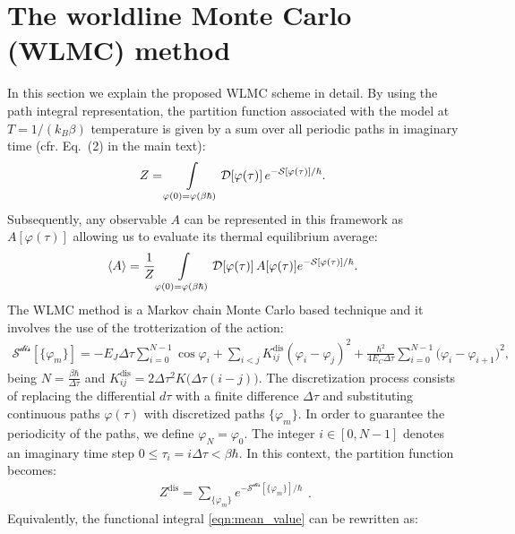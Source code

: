 \documentclass[aps,notitlepage,twocolumn,prl,nolongbibliography,superscriptaddress]{revtex4-2}
\begin{document}
\setcounter{equation}{0}
\renewcommand{\theequation}{S\arabic{equation}}
\setcounter{figure}{0}
\renewcommand{\thefigure}{S\arabic{figure}}
\setcounter{section}{0}
\renewcommand{\thesection}{S\Alph{section}}

\section{The worldline Monte Carlo (WLMC) method}
In this section we explain the proposed WLMC scheme in detail. By using the path integral representation, the partition function associated with the model at $T=1/(k_B\beta)$ temperature is given by a sum over all periodic paths in imaginary time (cfr. Eq.~(2) in the main text):
\begin{equation}\label{eqn:partiton}
    Z = \int\limits_{\varphi(0) = \varphi(\beta\hbar)} {\cal D} [\varphi(\tau)] \,e^{-\mathcal{S}[\varphi(\tau)]/\hbar}.
\end{equation}
Subsequently, any observable $A$ can be represented in this framework as $A[\varphi(\tau)]$ allowing us to evaluate its thermal equilibrium average:
\begin{equation}\label{eqn:mean_value}
    \langle A \rangle = \frac{1}{Z}\int\limits_{\varphi(0) = \varphi(\beta\hbar)} {\cal D} [\varphi(\tau)] \, A[\varphi(\tau)]e^{-\mathcal{S}[\varphi(\tau)]/\hbar}.
\end{equation}
The WLMC method is a Markov chain Monte Carlo based technique and it involves the use of the trotterization of the action:
\begin{equation}\label{eqn:disc_action}\begin{split}
    \mathcal{S^{\text{dis}}}[\{\varphi_m\}] = -E_J \Delta \tau \sum_{i=0}^{N-1}\cos\varphi_i+
    \sum_{i<j} K^{\text{dis}}_{ij}(\varphi_i-\varphi_j)^2+\frac{\hbar^2}{4E_C \Delta \tau}\sum_{i=0}^{N-1}\bigl(\varphi_i - \varphi_{i+1}\bigr)^2,
    \end{split}
\end{equation}
being $N = \frac{\beta\hbar}{\Delta \tau}$ and $K^{\text{dis}}_{ij} = 2\Delta \tau^2 K\bigl(\Delta\tau (i-j)\bigr)$. The discretization process consists of replacing the differential $d\tau$ with a finite difference $\Delta \tau$ and substituting continuous paths $\varphi(\tau)$ with discretized paths $\{\varphi_m\}$. In order to guarantee the periodicity of the paths, we define $\varphi_{N} = \varphi_0$. The integer $i \in [0, N-1]$ denotes an imaginary time step $0\le\tau_i = i\Delta \tau <\beta\hbar$. In this context, the partition function becomes:
\begin{equation}\label{eqn:disc_part}\begin{split}
    Z^{\text{dis}} = \sum_{\{\varphi_m\}}e^{-\mathcal{S^{\text{dis}}}[\{\varphi_m\}]/\hbar}
    \end{split}.
\end{equation}
Equivalently, the functional integral \eqref{eqn:mean_value} can be rewritten as:
\end{document}
